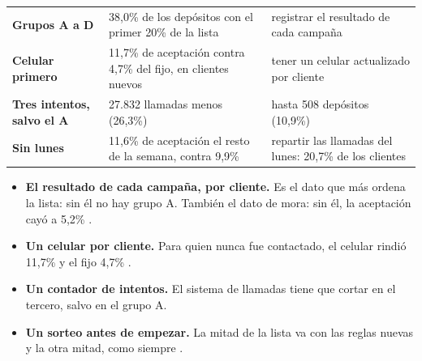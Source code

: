 \documentclass[10pt,a4paper]{article}
\begin{document}
\begin{bloque}
\begin{tabularx}{\linewidth}{@{}P{3.3cm}LL@{}}
\toprule
{} &  &  \\
\midrule
\textbf{Grupos A a D} & 38,0\% de los depósitos con el primer 20\% de la lista & registrar el resultado de cada campaña \\
\textbf{Celular primero} & 11,7\% de aceptación contra 4,7\% del fijo, en clientes nuevos & tener un celular actualizado por cliente \\
\textbf{Tres intentos, salvo el A} & 27.832 llamadas menos (26,3\%) & hasta 508 depósitos (10,9\%) \\
\textbf{Sin lunes} & 11,6\% de aceptación el resto de la semana, contra 9,9\% & repartir las llamadas del lunes: 20,7\% de los clientes \\
\bottomrule
\end{tabularx}
\end{bloque}

\begin{itemize}
\item \textbf{El resultado de cada campaña, por cliente.} Es el dato que más ordena la lista:
sin él no hay grupo A. También el dato de mora: sin él, la aceptación cayó a 5,2\%
.
\item \textbf{Un celular por cliente.} Para quien nunca fue contactado, el celular rindió 11,7\%
y el fijo 4,7\% .
\item \textbf{Un contador de intentos.} El sistema de llamadas tiene que cortar en el tercero, salvo en el
grupo A.
\item \textbf{Un sorteo antes de empezar.} La mitad de la lista va con las reglas nuevas y la
otra mitad, como siempre .
\end{itemize}
\end{document}
